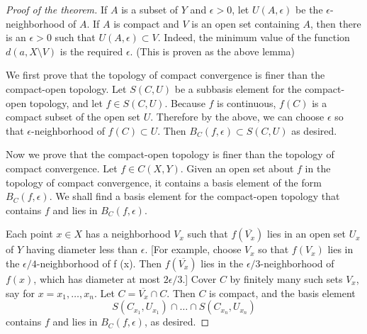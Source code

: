 \documentclass[article,11pt, reqno]{article}
\theoremstyle{remark}
\newcommand{\<}{\langle}
\renewcommand{\>}{\rangle}
\begin{document}
\begin{proof}[Proof of the theorem]
    If $A$ is a subset of $Y$ and $\epsilon > 0$, let $U(A,\epsilon)$ be the $\epsilon$-neighborhood of $A$. If $A$ is compact and $V$ is an open set containing $A$, then there is an $\epsilon > 0$ such that $U(A,\epsilon)\subset V$. Indeed, the minimum value of the function $d(a, X\setminus V)$ is the required $\epsilon$. (This is proven as the above lemma)
    
    We first prove that the topology of compact convergence is finer than the compact-open topology. Let $S(C,U)$ be a subbasis element for the compact-open topology, and let $f\in S(C,U)$. Because $f$ is continuous, $f(C)$ is a compact subset of the open set $U$. Therefore by the above, we can choose $\epsilon$ so that $\epsilon$-neighborhood of $f (C)\subset U$. Then $B_C(f,\epsilon)\subset S(C,U)$ as desired.

    Now we prove that the compact-open topology is finer than the topology of compact convergence. Let $f\in C(X,Y)$. Given an open set about $f$ in the topology of compact convergence, it contains a basis element of the form $B_C ( f,\epsilon)$. We shall find a basis element for the compact-open topology that contains $f$ and lies in $B_C ( f, \epsilon)$.

    Each point $x\in X$ has a neighborhood $V_x$ such that $f (\overline{V_x})$ lies in an open set $U_x$ of $Y$ having diameter less than $\epsilon$.
    [For example, choose $V_x$ so that $f(V_x)$ lies in the $\epsilon/4$-neighborhood of f (x). Then $f (\overline{V_x})$ lies in the $\epsilon/3$-neighborhood of $f (x)$, which has diameter at most $2\epsilon/3$.] Cover $C$ by finitely many such sets $V_x$, say for $x=x_1,\hdots,x_n$. Let $C =\overline{V_x}\cap C$. Then $C$ is compact, and the basis element
    $$
        S(C_{x_1} ,U_{x_1} )\cap\hdots\cap S(C_{x_n} ,U_{x_n} )
    $$
    contains $f$ and lies in $B_C ( f, \epsilon)$, as desired.
\end{proof}
\end{document}

